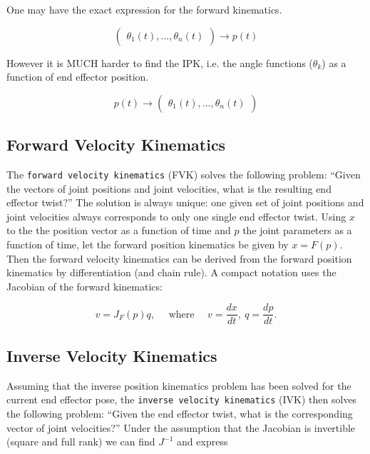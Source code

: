 One may have the exact expression for the forward kinematics.

\[\begin{pmatrix} \theta_1(t), ... , \theta_n(t)
           \end{pmatrix}\to p(t)\]

However it is MUCH harder to find the IPK, i.e. the angle functions
(\(\theta_k\)) as a function of end effector position.

\[p(t) \to \begin{pmatrix} \theta_1(t), ... , \theta_n(t)
           \end{pmatrix}\]

\hypertarget{forward-velocity-kinematics}{%
\subsection{Forward Velocity
Kinematics}\label{forward-velocity-kinematics}}

The \texttt{forward\ velocity\ kinematics} (FVK) solves the following
problem: ``Given the vectors of joint positions and joint velocities,
what is the resulting end effector twist?'' The solution is always
unique: one given set of joint positions and joint velocities always
corresponds to only one single end effector twist. Using \(x\) to the
the position vector as a function of time and \(p\) the joint parameters
as a function of time, let the forward position kinematics be given by
\(x = F(p)\). Then the forward velocity kinematics can be derived from
the forward position kinematics by differentiation (and chain rule). A
compact notation uses the Jacobian of the forward kinematics:

\[v = J_F(p) q, \quad  \mbox{ where } \quad v = \frac{dx}{dt}, ~ q = \frac{dp}{dt}.\]

\hypertarget{inverse-velocity-kinematics}{%
\subsection{Inverse Velocity
Kinematics}\label{inverse-velocity-kinematics}}

Assuming that the inverse position kinematics problem has been solved
for the current end effector pose, the
\texttt{inverse\ velocity\ kinematics} (IVK) then solves the following
problem: ``Given the end effector twist, what is the corresponding
vector of joint velocities?'' Under the assumption that the Jacobian is
invertible (square and full rank) we can find \(J^{-1}\) and express

